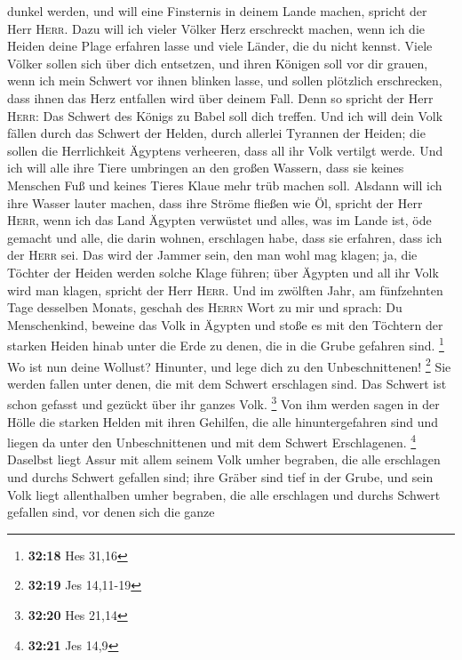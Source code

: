 dunkel werden, und will eine Finsternis in deinem Lande machen, spricht
der Herr \textsc{Herr}.  Dazu will ich vieler Völker Herz
erschreckt machen, wenn ich die Heiden deine Plage erfahren lasse und
viele Länder, die du nicht kennst.  Viele Völker sollen
sich über dich entsetzen, und ihren Königen soll vor dir grauen, wenn
ich mein Schwert vor ihnen blinken lasse, und sollen plötzlich
erschrecken, dass ihnen das Herz entfallen wird über deinem Fall.
 Denn so spricht der Herr \textsc{Herr}: Das Schwert des
Königs zu Babel soll dich treffen.  Und ich will dein
Volk fällen durch das Schwert der Helden, durch allerlei Tyrannen der
Heiden; die sollen die Herrlichkeit Ägyptens verheeren, dass all ihr
Volk vertilgt werde.  Und ich will alle ihre Tiere
umbringen an den großen Wassern, dass sie keines Menschen Fuß und keines
Tieres Klaue mehr trüb machen soll.  Alsdann will ich
ihre Wasser lauter machen, dass ihre Ströme fließen wie Öl, spricht der
Herr \textsc{Herr},  wenn ich das Land Ägypten verwüstet
und alles, was im Lande ist, öde gemacht und alle, die darin wohnen,
erschlagen habe, dass sie erfahren, dass ich der \textsc{Herr} sei.
 Das wird der Jammer sein, den man wohl mag klagen; ja,
die Töchter der Heiden werden solche Klage führen; über Ägypten und all
ihr Volk wird man klagen, spricht der Herr \textsc{Herr}.
 Und im zwölften Jahr, am fünfzehnten Tage desselben
Monats, geschah des \textsc{Herrn} Wort zu mir und sprach:
 Du Menschenkind, beweine das Volk in Ägypten und stoße
es mit den Töchtern der starken Heiden hinab unter die Erde zu denen,
die in die Grube gefahren sind. \footnote{\textbf{32:18} Hes 31,16}
 Wo ist nun deine Wollust? Hinunter, und lege dich zu den
Unbeschnittenen! \footnote{\textbf{32:19} Jes 14,11-19} 
Sie werden fallen unter denen, die mit dem Schwert erschlagen sind. Das
Schwert ist schon gefasst und gezückt über ihr ganzes Volk. \footnote{\textbf{32:20}
  Hes 21,14}  Von ihm werden sagen in der Hölle die
starken Helden mit ihren Gehilfen, die alle hinuntergefahren sind und
liegen da unter den Unbeschnittenen und mit dem Schwert Erschlagenen.
\footnote{\textbf{32:21} Jes 14,9}  Daselbst liegt Assur
mit allem seinem Volk umher begraben, die alle erschlagen und durchs
Schwert gefallen sind;  ihre Gräber sind tief in der
Grube, und sein Volk liegt allenthalben umher begraben, die alle
erschlagen und durchs Schwert gefallen sind, vor denen sich die ganze
